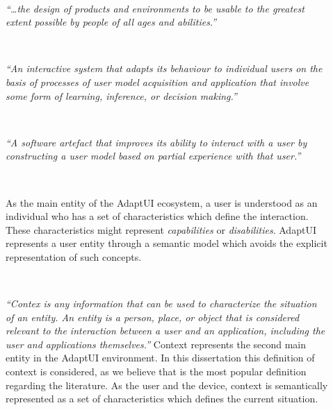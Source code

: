 \begin{description}
  \item[] \hfill \\
  \begin{mdframed}[hidealllines=true,backgroundcolor=gray!20]
  \textit{``\dots the design of products and environments to be usable to the
  greatest extent possible by people of all ages and abilities.''} 
  \end{mdframed}

  \item[] \hfill \\
  \begin{mdframed}[hidealllines=true,backgroundcolor=gray!20]
  \textit{``An interactive system that adapts its behaviour to individual users
  on the basis of processes of user model acquisition and application that
  involve some form of learning, inference, or decision making.''} 
  \end{mdframed}

  \item[] \hfill \\
  \begin{mdframed}[hidealllines=true,backgroundcolor=gray!20]
  \textit{``A software artefact that improves its ability to interact with a user
  by constructing a user model based on partial experience with that user.''} 
  \end{mdframed}

  \item[] \hfill \\
  \begin{mdframed}[hidealllines=true,backgroundcolor=gray!20]
  As the main entity of the AdaptUI ecosystem, a user is understood as an individual
  who has a set of characteristics which define the interaction. These characteristics 
  might represent \textit{capabilities} or \textit{disabilities}. AdaptUI represents 
  a user entity through a semantic model which avoids the explicit representation 
  of such concepts. 
  \end{mdframed}

  \item[] \hfill \\
  \begin{mdframed}[hidealllines=true,backgroundcolor=gray!20]
  \textit{``Contex is any information that can be used to characterize the 
  situation of an entity. An entity is a person, place, or object that is 
  considered relevant to the interaction between a user and an application, 
  including the user and applications themselves.''} Context represents the 
  second main entity in the AdaptUI environment. In this dissertation this 
  definition of context is considered, as we believe that is the most popular 
  definition regarding the literature. As the user and the device, context is 
  semantically represented as a set of characteristics which defines the current 
  situation.
  \end{mdframed}
  

\end{description}
